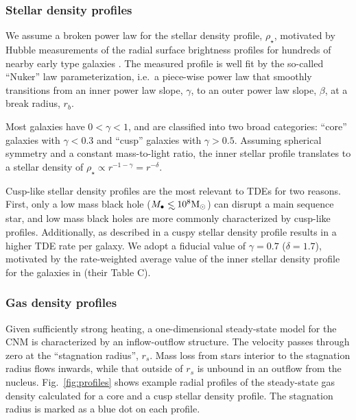 \documentclass[usenatbib,fleqn]{mnras}
\newcommand\lsim{\mathrel{\rlap{\lower4pt\hbox{\hskip1pt$\sim$}}
    \raise1pt\hbox{$<$}}}
\newcommand{\Mbh}[1][]{M_{\bullet#1}}
\newcommand{\Msun}{{\rm M_\odot}}
\newcommand{\rs}{r_s}
\begin{document}
\subsubsection{Stellar density profiles}
We assume a broken power law for the stellar density profile,
$\rho_{\star}$, motivated by Hubble measurements of the radial surface
brightness profiles for hundreds of nearby early type galaxies
\citep{Lauer+2007}.  The measured profile is well fit by the so-called
``Nuker'' law parameterization, i.e.~a piece-wise power law that smoothly
transitions from an inner power law slope, $\gamma$, to an outer power
law slope, $\beta$, at a break radius, $r_b$.

Most galaxies have $0<\gamma<1$, and are classified into two broad
categories: ``core'' galaxies with $\gamma<0.3$ and ``cusp'' galaxies with
$\gamma>0.5$. Assuming spherical symmetry and a constant mass-to-light
ratio, the inner stellar profile translates to a stellar density of
$\rho_\star\propto r^{-1-\gamma}=r^{-\delta}$. 

Cusp-like stellar density profiles are the most relevant to TDEs for
two reasons.  First, only a low mass black hole ($\Mbh\lsim 10^8
\Msun$) can disrupt a main sequence star, and low mass black
holes are more commonly characterized by cusp-like profiles.
Additionally, as described in \citet{Stone&Metzger2016} a cuspy
stellar density profile results in a higher TDE rate per galaxy.  We
adopt a fiducial value of $\gamma=0.7$ ($\delta=1.7$), motivated by
the rate-weighted average value of the inner stellar density profile
for the galaxies in \citet{Stone&Metzger2016} (their Table C).


\subsubsection{Gas density profiles}
\label{sec:dProf}
Given sufficiently strong heating, a one-dimensional steady-state
model for the CNM is characterized by an inflow-outflow structure.
The velocity passes through zero at the ``stagnation radius'', $\rs$.
Mass loss from stars interior to the stagnation radius flows inwards,
while that outside of $\rs$ is unbound in an outflow from the nucleus.
Fig.~\ref{fig:profiles} shows example radial profiles of the
steady-state gas density calculated for a core and a cusp stellar
density profile. The stagnation radius is marked as a blue dot on each
profile.
\end{document}
